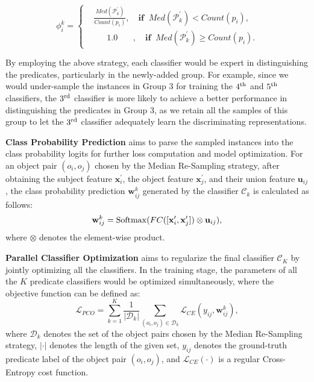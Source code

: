 \documentclass[10pt,twocolumn,letterpaper]{article}
\begin{document}
\vspace{-0.4cm}
\begin{equation}
    \phi_{i}^{k} = 
	\left\{
	\begin{aligned}
		& \frac{Med({\mathcal{P}}_{k}^{\prime})}{ Count({p}_{i}) },\quad \mathbf{if}\;\; Med({\mathcal{P}}_{k}^{\prime})< Count({p}_{i}),
		\\
		&{ \quad\;\; 1.0 \;\;\;\quad } ,  \quad \mathbf{if}\;\; Med({\mathcal{P}}_{k}^{\prime}) \geq Count({p}_{i}).
	\end{aligned}
	\right.
\end{equation}

By employing the above strategy, each classifier would be expert in distinguishing the predicates, particularly in the newly-added group. For example, since we would under-sample the instances in Group 3 for training the $4^{\rm th}$ and $5^{\rm th}$ classifiers, the $3^{\rm rd}$ classifier is more likely to achieve a better performance in distinguishing the predicates in Group 3, as we retain all the samples of this group to let the $3^{\rm rd}$ classifier adequately learn the discriminating representations.

\textbf{Class Probability Prediction} aims to parse the sampled instances into the class probability logits for further loss computation and model optimization. For an object pair $(o_{i}, o_{j})$ chosen by the Median Re-Sampling strategy, after obtaining the subject feature $\mathbf{x}^{\prime}_i$, the object feature $\mathbf{x}^{\prime}_j$, and their union feature $\mathbf{u}_{ij}$, the class probability prediction $\mathbf{w}_{ij}^{k} $ generated by the classifier $\mathcal{C}_{k}$ is calculated as follows:
\begin{equation}
    \mathbf{w}_{ij}^{k} = {\rm Softmax}(FC([\mathbf{x}^{\prime}_i , \mathbf{x}^{\prime}_j]) \otimes \mathbf{u}_{ij}),
\end{equation}
where $\otimes$ denotes the element-wise product.

\textbf{Parallel Classifier Optimization} aims to regularize the final classifier $\mathcal{C}_{K}$ by jointly optimizing all the classifiers. In the training stage, the parameters of all the $K$ predicate classifiers would be optimized simultaneously, where the objective function can be defined as:
\begin{equation}
	\mathcal{L}_{PCO}=\sum_{k=1}^{K} \frac{1}{|\mathcal{D}_k|}\sum_{{(o_i,o_j)} \in \mathcal{D}_k}  \mathcal{L}_{CE} ({y}_{ij}, \mathbf{w}_{ij}^{k}),
\end{equation}
where $\mathcal{D}_k$ denotes the set of the object pairs chosen by the Median Re-Sampling strategy, $| \cdot |$ denotes the length of the given set, ${y}_{ij}$ denotes the ground-truth predicate label of the object pair $(o_{i}, o_{j})$, and $\mathcal{L}_{CE}(\cdot)$ is a regular Cross-Entropy cost function. 
\end{document}
